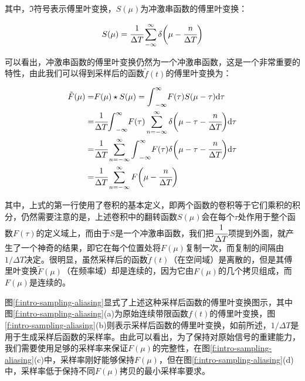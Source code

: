 \noindent 其中，$\Im$符号表示傅里叶变换，$S(\mu)$为冲激串函数的傅里叶变换：

\begin{equation}
	S(\mu)=\cfrac{1}{\Delta T}\sum^{\infty}_{-\infty}\delta\bigg(\mu -\cfrac{n}{\Delta T}\bigg)
\end{equation}

可以看出，冲激串函数的傅里叶变换仍然为一个冲激串函数，这是一个非常重要的特性，由此我们可以得到采样后的函数$\tilde{f}(t)$的傅里叶变换为：

\begin{equation}
\begin{aligned}
	\tilde{F}(\mu)=&F(\mu)\star S(\mu)={\rm \int}^{\infty}_{-\infty}F(\tau)S(\mu-\tau){\rm d}\tau\\
	=&\cfrac{1}{\Delta T}{\rm \int}^{\infty}_{-\infty}F(\tau)\sum^{\infty}_{n=-\infty}\delta\bigg(\mu-\tau-\cfrac{n}{\Delta T}\bigg){\rm d}\tau\\
	=&\cfrac{1}{\Delta T}\sum^{\infty}_{n=-\infty}{\rm \int}^{\infty}_{-\infty}F(\tau)\delta\bigg(\mu-\tau-\cfrac{n}{\Delta T}\bigg){\rm d}\tau\\
	=&\cfrac{1}{\Delta T}\sum^{\infty}_{n=-\infty}F\bigg(\mu-\cfrac{n}{\Delta T}\bigg)
\end{aligned}
\end{equation}

\noindent 其中，上式的第一行使用了卷积的基本定义，即两个函数的卷积等于它们乘积的积分，仍然需要注意的是，上述卷积中的翻转函数$S(\mu)$会在每个$\tau$处作用于整个函数$F(\tau)$的定义域上，而由于$S$是一个冲激串函数，我们把$\cfrac{1}{\Delta T}$项提到外面，就产生了一个神奇的结果，即它在每个位置处将$F(\mu)$复制一次，而复制的间隔由$1/\Delta T$决定。很明显，虽然采样后的函数$\tilde{f}(t)$（在空间域）是离散的，但是其傅里叶变换$\tilde{F}(\mu)$（在频率域）却是连续的，因为它由$F(\mu)$的几个拷贝组成，而$F(\mu)$是连续的。

图\ref{f:intro-sampling-aliasing}显式了上述这种采样后函数的傅里叶变换图示，其中图\ref{f:intro-sampling-aliasing}(a)为原始连续带限函数$f(t)$的傅里叶变换，图\ref{f:intro-sampling-aliasing}(b)则表示采样后函数的傅里叶变换，如前所述，$1/\Delta T$是用于生成采样后函数的采样率。由此可以看出，为了保持对原始信号的重建能力，我们需要使用足够的采样率来保证$F(\mu)$的完整性，在图\ref{f:intro-sampling-aliasing}(c)中，采样率刚好能够保持$F(\mu)$，但在图\ref{f:intro-sampling-aliasing}(d)中，采样率低于保持不同$F(\mu)$拷贝的最小采样率要求。

